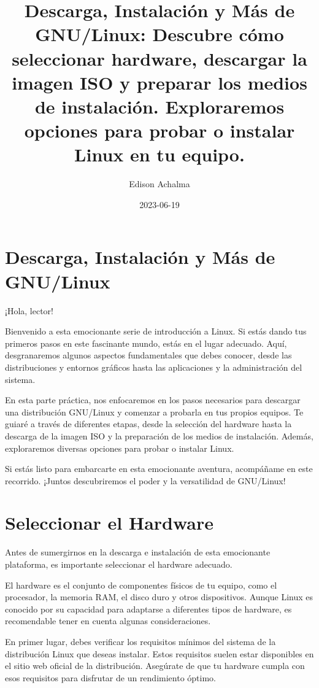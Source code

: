 \documentclass[
  jou,
  floatsintext,
  longtable,
  a4paper,
  nolmodern,
  notxfonts,
  notimes,
  colorlinks=true,linkcolor=blue,citecolor=blue,urlcolor=blue]{apa7}
\title{Descarga, Instalación y Más de GNU/Linux: Descubre cómo
seleccionar hardware, descargar la imagen ISO y preparar los medios de
instalación. Exploraremos opciones para probar o instalar Linux en tu
equipo.}
\author{Edison Achalma}
\affiliation{
{Escuela Profesional de Economía, Universidad Nacional de San Cristóbal
de Huamanga}}
\date{2023-06-19}
\begin{document}
\maketitle

\hypertarget{toc}{}
\tableofcontents
\newpage
\section[Introduction]{Descarga, Instalación y Más de GNU/Linux}

\setcounter{secnumdepth}{-\maxdimen} %

\setlength\LTleft{0pt}


¡Hola, lector!

Bienvenido a esta emocionante serie de introducción a Linux. Si estás
dando tus primeros pasos en este fascinante mundo, estás en el lugar
adecuado. Aquí, desgranaremos algunos aspectos fundamentales que debes
conocer, desde las distribuciones y entornos gráficos hasta las
aplicaciones y la administración del sistema.

En esta parte práctica, nos enfocaremos en los pasos necesarios para
descargar una distribución GNU/Linux y comenzar a probarla en tus
propios equipos. Te guiaré a través de diferentes etapas, desde la
selección del hardware hasta la descarga de la imagen ISO y la
preparación de los medios de instalación. Además, exploraremos diversas
opciones para probar o instalar Linux.

Si estás listo para embarcarte en esta emocionante aventura, acompáñame
en este recorrido. ¡Juntos descubriremos el poder y la versatilidad de
GNU/Linux!

\section{Seleccionar el Hardware}\label{seleccionar-el-hardware}

Antes de sumergirnos en la descarga e instalación de esta emocionante
plataforma, es importante seleccionar el hardware adecuado.

El hardware es el conjunto de componentes físicos de tu equipo, como el
procesador, la memoria RAM, el disco duro y otros dispositivos. Aunque
Linux es conocido por su capacidad para adaptarse a diferentes tipos de
hardware, es recomendable tener en cuenta algunas consideraciones.

En primer lugar, debes verificar los requisitos mínimos del sistema de
la distribución Linux que deseas instalar. Estos requisitos suelen estar
disponibles en el sitio web oficial de la distribución. Asegúrate de que
tu hardware cumpla con esos requisitos para disfrutar de un rendimiento
óptimo.
\end{document}
